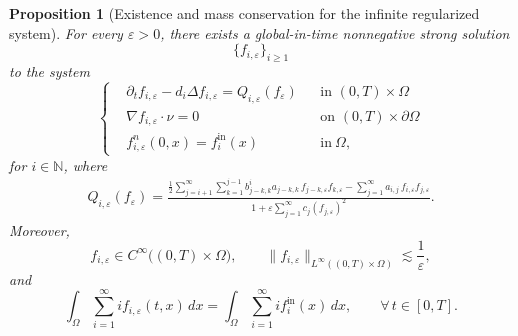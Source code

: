 \documentclass[a4paper,12pt,reqno]{amsart}
\theoremstyle{plain}
\newtheorem{prop}[thm]{Proposition}
\numberwithin{equation}{section}
\begin{document}
	\begin{prop}[Existence and mass conservation for the infinite regularized system]
		\label{prop:infinite_mass}
		For every $\varepsilon>0$, there exists a global-in-time nonnegative strong solution
		\[
		\{f_{i,\varepsilon}\}_{i\ge1}
		\]
		to the system
		\begin{equation}
			\label{eq:RNFE}
			\left\{
			\begin{aligned}
				& \partial_t f_{i,\varepsilon} - d_i \Delta f_{i,\varepsilon}
				= Q_{i,\varepsilon}(f_{\varepsilon})
				&& \text{in } (0,T)\times\Omega \\
				& \nabla f_{i,\varepsilon} \cdot \nu = 0
				&& \text{on } (0,T)\times\partial\Omega \\
				& f_{i,\varepsilon}^n(0,x) = f_i^{\mathrm{in}}(x)
				&& \text{in}\ \Omega,
			\end{aligned}
			\right.
		\end{equation}
		for $i\in\mathbb{N}$, where
		\begin{align}
			\label{eq:RNFEoperator}
			Q_{i,\varepsilon}(f_{\varepsilon})
			= \frac{
				\frac{1}{2}\displaystyle\sum_{j=i+1}^{\infty} \sum_{k=1}^{j-1}
				b_{j-k,k}^i a_{j-k,k}\,
				f_{j-k,\varepsilon} f_{k,\varepsilon}
				-
				\displaystyle\sum_{j=1}^{\infty}
				a_{i,j}\, f_{i,\varepsilon} f_{j,\varepsilon}
			}{
				1 + \varepsilon\displaystyle\sum_{j=1}^{\infty}
				c_j (f_{j,\varepsilon})^2
			}.
		\end{align}
		Moreover,
		\[
		f_{i,\varepsilon} \in C^\infty\big((0,T)\times\Omega\big),
		\qquad
		\| f_{i,\varepsilon} \|_{L^\infty((0,T)\times\Omega)}
		\lesssim \frac{1}{\varepsilon},
		\]
		and
		\[
		\int_\Omega \sum_{i=1}^{\infty} i f_{i,\varepsilon}(t,x)\,dx
		=
		\int_\Omega \sum_{i=1}^{\infty} i f_i^{\mathrm{in}}(x)\,dx,
		\qquad \forall\, t\in[0,T].
		\]
	\end{prop}
	
\end{document}
